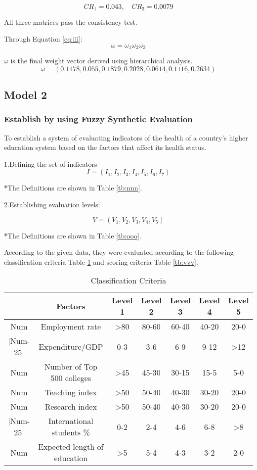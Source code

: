 \documentclass[12pt]{article}  %
\begin{document}
$$
CR_{1}=0.043,
\quad CR_3=0.0079
$$

All three matrices pass the consistency test.

Through Equation \eqref{eq:iii}:
\begin{equation}\label{eq:iii}%
\omega=\omega_1\omega_2\omega_3
\end{equation}

$\omega$ is the final weight vector derived using hierarchical analysis.
$$
\omega=(0.1178,0.055,0.1879,0.2028,0.0614,0.1116,0.2634)
$$
\subsection{Model 2}
\subsubsection{Establish by using Fuzzy Synthetic Evaluation}
To establish a system of evaluating indicators of the health of a country's higher education system based on the factors that affect its health status.

1.Defining the set of indicators
$$I=(I_1,I_2,I_3,I_4,I_5,I_6,I_7)$$

*The Definitions are shown in Table \ref{tb:nnn}.

2.Establishing evaluation levels:

$$V=(V_1,V_2,V_3,V_4,V_5)$$

*The Definitions are shown in Table \ref{tb:ooo}.

According to the given data, they were evaluated according to the following classification criteria Table \ref{tb:sss} and scoring criteria Table \ref{tb:vvv}.
\begin{table}[htp]
	\caption{Classification Criteria}
	\begin{tabular}{|c|c|c|c|c|c|c|}
		\hline
		& Factors                      & Level 1          & Level 2 & Level 3 & Level 4 & Level 5          \\ \hline
		Num      & Employment rate              & \textgreater{}80 & 80-60   & 60-40   & 40-20   & 20-0             \\ \hline
		|Num-25| & Expenditure/GDP              & 0-3              & 3-6     & 6-9     & 9-12    & \textgreater{}12 \\ \hline
		Num      & Number of Top 500 colleges   & \textgreater{}45 & 45-30   & 30-15   & 15-5    & 5-0              \\ \hline
		Num      & Teaching index               & \textgreater{}50 & 50-40   & 40-30   & 30-20   & 20-0             \\ \hline
		Num      & Research index               & \textgreater{}50 & 50-40   & 40-30   & 30-20   & 20-0             \\ \hline
		|Num-25| & International students \%    & 0-2              & 2-4     & 4-6     & 6-8     & \textgreater{}8  \\ \hline
		Num      & Expected length of education & \textgreater{}5  & 5-4     & 4-3     & 3-2     & 2-0              \\ \hline
	\end{tabular}\label{tb:sss}
\end{table}
\end{document}
